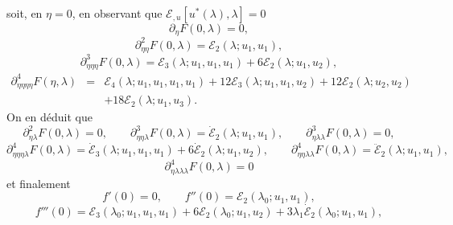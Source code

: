 \documentclass{article}
\newcommand{\nocomma}{}
\begin{document}
soit, en $\eta = 0$, en observant que $\mathcal{E}_{, u} [u^{\ast} (\lambda),
\lambda] = 0$
\begin{equation}
  \partial_{\eta} F (0, \lambda) = 0,
\end{equation}
\begin{equation}
  \partial_{\eta \nocomma \eta}^2 F (0, \lambda) =\mathcal{E}_2 (\lambda ;
  u_1, u_1),
\end{equation}
\begin{equation}
  \partial_{\eta \nocomma \eta \nocomma \eta}^3 F (0, \lambda) =\mathcal{E}_3
  (\lambda ; u_1, u_1, u_1) + 6\mathcal{E}_2 (\lambda ; u_1, u_2),
\end{equation}
\begin{eqnarray}
  \partial_{\eta \nocomma \eta \nocomma \eta \nocomma \eta}^4 F (\eta,
  \lambda) & = & \mathcal{E}_4 (\lambda ; u_1, u_1, u_1, u_1) +
  12\mathcal{E}_3 (\lambda ; u_1, u_1, u_2) + 12\mathcal{E}_2 (\lambda ; u_2,
  u_2) \nonumber\\
  &  & + 18\mathcal{E}_2 (\lambda ; u_1, u_3) . 
\end{eqnarray}
On en d{\'e}duit que
\begin{equation}
  \partial_{\eta \nocomma \lambda}^2 F (0, \lambda) = 0, \qquad \partial_{\eta
  \nocomma \eta \nocomma \lambda}^3 F (0, \lambda) = \dot{\mathcal{E}}_2
  (\lambda ; u_1, u_1), \qquad \partial_{\eta \nocomma \lambda \nocomma
  \lambda}^3 F (0, \lambda) = 0,
\end{equation}
\begin{equation}
  \partial_{\eta \nocomma \eta \nocomma \eta \nocomma \lambda}^4 F (0,
  \lambda) = \dot{\mathcal{E}}_3 (\lambda ; u_1, u_1, u_1) + 6
  \dot{\mathcal{E}}_2 (\lambda ; u_1, u_2), \qquad \partial_{\eta \nocomma
  \eta \nocomma \lambda \nocomma \lambda}^4 F (0, \lambda) =
  \ddot{\mathcal{E}}_2 (\lambda ; u_1, u_1),
\end{equation}
\begin{equation}
  \partial_{\eta \nocomma \lambda \nocomma \lambda \nocomma \lambda}^4 F (0,
  \lambda) = 0
\end{equation}
et finalement
\begin{equation}
  f' (0) = 0, \qquad f'' (0) =\mathcal{E}_2 (\lambda_0 ; u_1, u_1),
\end{equation}
\begin{equation}
  f''' (0) =\mathcal{E}_3 (\lambda_0 ; u_1, u_1, u_1) + 6\mathcal{E}_2
  (\lambda_0 ; u_1, u_2) + 3 \lambda_1  \dot{\mathcal{E}}_2 (\lambda_0 ; u_1,
  u_1),
\end{equation}
\end{document}

